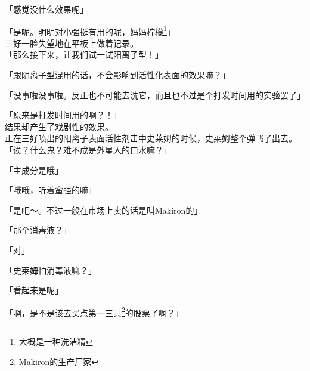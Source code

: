 「感觉没什么效果呢」

「是呢。明明对小强挺有用的呢，妈妈柠檬\footnote{大概是一种洗洁精}」\\

三好一脸失望地在平板上做着记录。\\

「那么接下来，让我们试一试阳离子型！」

「跟阴离子型混用的话，不会影响到活性化表面的效果嘛？」

「没事啦没事啦。反正也不可能去洗它，而且也不过是个打发时间用的实验罢了」

「原来是打发时间用的啊？！」\\

结果却产生了戏剧性的效果。\\

正在三好喷出的阳离子表面活性剂击中史莱姆的时候，史莱姆整个弹飞了出去。\\

「诶？什么鬼？难不成是外星人的口水嘛？」

「主成分是哦」

「哦哦，听着蛮强的嘛」

「是吧～。不过一般在市场上卖的话是叫Makiron的」

「那个消毒液？」

「对」

「史莱姆怕消毒液嘛？」

「看起来是呢」

「啊，是不是该去买点第一三共\footnote{Makiron的生产厂家}的股票了啊？」

